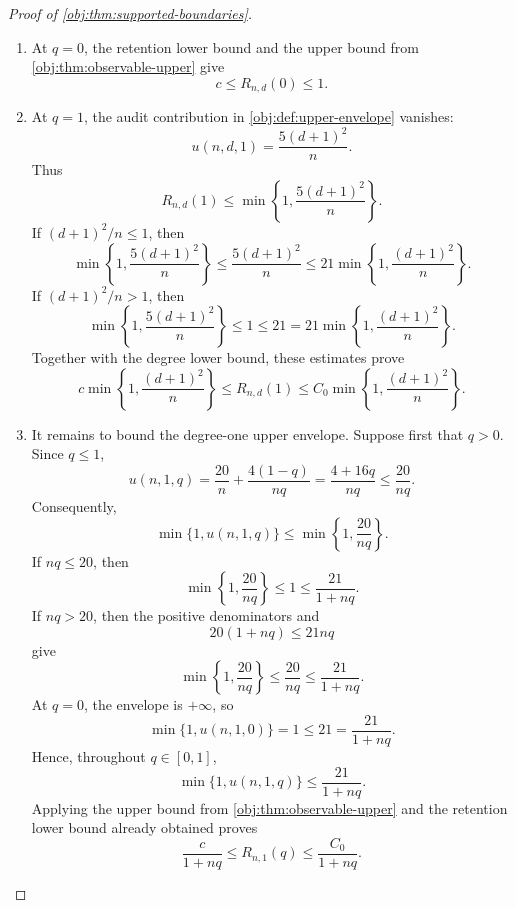 \begin{proof}[Proof of \cref{obj:thm:supported-boundaries}]
\begin{enumerate}
\item At \(q=0\), the retention lower bound and the upper bound from \cref{obj:thm:observable-upper} give
\[
c\le R_{n,d}(0)\le1.
\]

\item At \(q=1\), the audit contribution in \cref{obj:def:upper-envelope} vanishes:
\[
u(n,d,1)=\frac{5(d+1)^2}{n}.
\]
Thus
\[
R_{n,d}(1)\le
\min\left\{1,\frac{5(d+1)^2}{n}\right\}.
\]
If \((d+1)^2/n\le1\), then
\[
\min\left\{1,\frac{5(d+1)^2}{n}\right\}
\le\frac{5(d+1)^2}{n}
\le
21\min\left\{1,\frac{(d+1)^2}{n}\right\}.
\]
If \((d+1)^2/n>1\), then
\[
\min\left\{1,\frac{5(d+1)^2}{n}\right\}
\le1\le21
=
21\min\left\{1,\frac{(d+1)^2}{n}\right\}.
\]
Together with the degree lower bound, these estimates prove
\[
c\min\left\{1,\frac{(d+1)^2}{n}\right\}
\le R_{n,d}(1)
\le
C_0\min\left\{1,\frac{(d+1)^2}{n}\right\}.
\]

\item It remains to bound the degree-one upper envelope. Suppose first that \(q>0\). Since \(q\le1\),
\[
u(n,1,q)
=
\frac{20}{n}+\frac{4(1-q)}{nq}
=
\frac{4+16q}{nq}
\le\frac{20}{nq}.
\]
Consequently,
\[
\min\{1,u(n,1,q)\}
\le
\min\left\{1,\frac{20}{nq}\right\}.
\]
If \(nq\le20\), then
\[
\min\left\{1,\frac{20}{nq}\right\}
\le1\le\frac{21}{1+nq}.
\]
If \(nq>20\), then the positive denominators and
\[
20(1+nq)\le21nq
\]
give
\[
\min\left\{1,\frac{20}{nq}\right\}
\le\frac{20}{nq}
\le\frac{21}{1+nq}.
\]
At \(q=0\), the envelope is \(+\infty\), so
\[
\min\{1,u(n,1,0)\}=1\le21=\frac{21}{1+nq}.
\]
Hence, throughout \(q\in[0,1]\),
\[
\min\{1,u(n,1,q)\}\le\frac{21}{1+nq}.
\]
Applying the upper bound from \cref{obj:thm:observable-upper} and the retention lower bound already obtained proves
\[
\frac{c}{1+nq}
\le R_{n,1}(q)
\le\frac{C_0}{1+nq}.
\]
\end{enumerate}
\end{proof}

